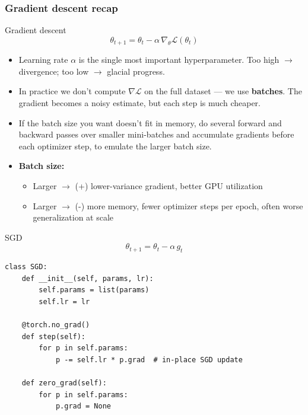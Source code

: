 \begin{frame}
\frametitle{Gradient descent recap}
\begin{block}{Gradient descent}
    $$ \theta_{t+1} = \theta_t - \alpha\, \nabla_\theta \mathcal{L}(\theta_t) $$
\end{block}
\begin{itemize}
    \pause
    \item Learning rate $\alpha$ is the single most important hyperparameter.
    Too high $\to$ divergence; too low $\to$ glacial progress.
    \pause
    \item In practice we don't compute $\nabla \mathcal{L}$ on the full
    dataset --- we use \textbf{batches}. The gradient becomes a noisy
    estimate, but each step is much cheaper.
    \pause
    \item If the batch size you want doesn't fit in memory, do several forward and
    backward passes over smaller mini-batches and accumulate gradients before
    each optimizer step, to emulate the larger batch size.
    \pause
    \item \textbf{Batch size:}
    \begin{itemize}
        \item Larger $\to$ (+) lower-variance gradient, better GPU utilization
        \item Larger $\to$ (-) more memory, fewer optimizer steps per epoch,
        often worse generalization at scale
    \end{itemize}
\end{itemize}
\end{frame}

\begin{frame}[fragile]
\begin{block}{SGD}
$$ \theta_{t+1} = \theta_t - \alpha\, g_t $$
\end{block}
\begin{block}{}
\begin{lstlisting}[basicstyle=\normalsize\ttfamily]
class SGD:
    def __init__(self, params, lr):
        self.params = list(params)
        self.lr = lr

    @torch.no_grad()
    def step(self):
        for p in self.params:
            p -= self.lr * p.grad  # in-place SGD update

    def zero_grad(self):
        for p in self.params:
            p.grad = None
\end{lstlisting}
\end{block}
\end{frame}

